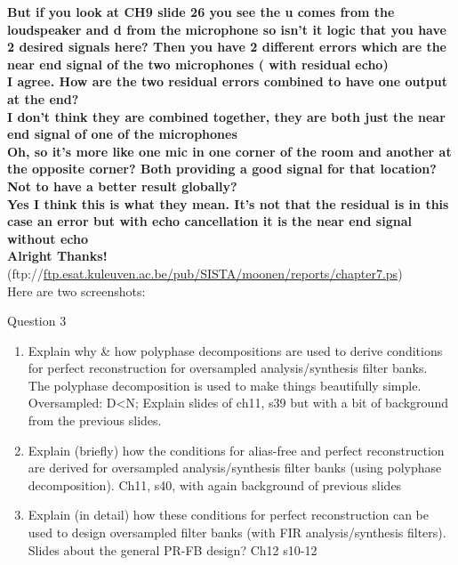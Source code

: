 \documentclass[
  a4paper,
  ,captions=tableheading
]{scrartcl}
\providecommand{\tightlist}{%
  \setlength{\itemsep}{0pt}\setlength{\parskip}{0pt}}
\begin{document}
\begin{enumerate}
  \textbf{But if you look at CH9 slide 26 you see the u comes from the
  loudspeaker and d from the microphone so isn't it logic that you have
  2 desired signals here? Then you have 2 different errors which are the
  near end signal of the two microphones ( with residual echo)}\\
  \textbf{I agree. How are the two residual errors combined to have one
  output at the end?}\\
  \textbf{I don't think they are combined together, they are both just
  the near end signal of one of the microphones}\\
  \textbf{Oh, so it's more like one mic in one corner of the room and
  another at the opposite corner? Both providing a good signal for that
  location? Not to have a better result globally?}\\
  \textbf{Yes I think this is what they mean. It's not that the residual
  is in this case an error but with echo cancellation it is the near end
  signal without echo}\\
  \textbf{Alright Thanks!}\\
  (ftp://\href{http://ftp.esat.kuleuven.ac.be/pub/SISTA/moonen/reports/chapter7.ps}{ftp.esat.kuleuven.ac.be/pub/SISTA/moonen/reports/chapter7.ps})\\
  Here are two screenshots:\\
\end{enumerate}

Question 3

\begin{enumerate}
\def\labelenumi{\arabic{enumi}.}
\tightlist
\item
  Explain why \& how polyphase decompositions are used to derive
  conditions for perfect reconstruction for oversampled
  analysis/synthesis filter banks.\\
  The polyphase decomposition is used to make things beautifully simple.
  Oversampled: D\textless N; Explain slides of ch11, s39 but with a bit
  of background from the previous slides.\\
\item
  Explain (briefly) how the conditions for alias-free and perfect
  reconstruction are derived for oversampled analysis/synthesis filter
  banks (using polyphase decomposition). Ch11, s40, with again
  background of previous slides\\
\item
  Explain (in detail) how these conditions for perfect reconstruction
  can be used to design oversampled filter banks (with FIR
  analysis/synthesis filters).\\
  Slides about the general PR-FB design? Ch12 s10-12
\end{enumerate}
\end{document}
